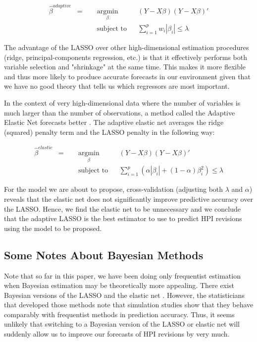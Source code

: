 \documentclass[AER]{AEA}
\begin{document}
\[
\begin{aligned}
\hat{\beta}^{adaptive} \;\; = \quad
& \underset{\beta}{\text{argmin}}
& & \left( Y - X\beta \right)\left( Y - X\beta \right)' \\
& \text{subject to}
& & \sum_{i=1}^p w_i|\beta_i| \leq \lambda
\end{aligned}
\]

The advantage of the LASSO over other high-dimensional estimation procedures (ridge, principal-components regression, etc.) is that it effectively performs both variable selection and "shrinkage" at the same time. This makes it more flexible and thus more likely to produce accurate forecasts in our environment given that we have no good theory that tells us which regressors are most important.

In the context of very high-dimensional data where the number of variables is much larger than the number of observations, a method called the Adaptive Elastic Net forecasts better \cite{adaptiveElasticNet}. The adaptive elastic net averages the ridge (squared) penalty term and the LASSO penalty in the following way:

\[
\begin{aligned}
\hat{\beta}^{elastic} \;\; = \quad
& \underset{\beta}{\text{argmin}}
& & \left( Y - X\beta \right)\left( Y - X\beta \right)' \\
& \text{subject to}
& & \sum_{i=1}^p \left( \alpha |\beta_i| + \left(1 - \alpha\right) \beta_i^2 \right) \leq \lambda
\end{aligned}
\]

For the model we are about to propose, cross-validation (adjusting both $\lambda$ and $\alpha$) reveals that the elastic net does not significantly improve predictive accuracy over the LASSO. Hence, we find the elastic net to be unnecessary and we conclude that the adaptive LASSO is the best estimator to use to predict HPI revisions using the model to be proposed.

\subsection{Some Notes About Bayesian Methods}

Note that so far in this paper, we have been doing only frequentist estimation when Bayesian estimation may be theoretically more appealing. There exist Bayesian versions of the LASSO and the elastic net \cite{BayesLasso,BayesElasticNet}. However, the statisticians that developed those methods note that simulation studies show that they behave comparably with frequentist methods in prediction accuracy. Thus, it seems unlikely that switching to a Bayesian version of the LASSO or elastic net will suddenly allow us to improve our forecasts of HPI revisions by very much.
\end{document}

